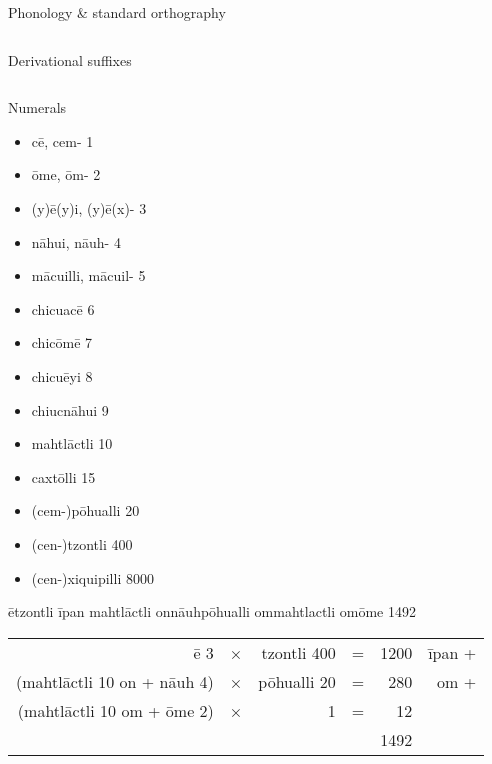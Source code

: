\documentclass[12pt]{beamer}
\newcommand{\nah}[1]{\textcolor{nahgrn}{#1}}
\newcommand{\trs}[1]{\textcolor{nahblu}{#1}}
\begin{document}
\begin{frame}
\begin{columns}[t]
\begin{column}{.22\linewidth}
\begin{block}{Phonology \& standard orthography}
\begin{threeparttable}
\begin{tablenotes}
\begin{frame}
\begin{columns}[t]
\begin{column}{.22\linewidth}
\begin{block}{Derivational suffixes}
\begin{threeparttable}
\begin{multicols}{2}
\begin{itemize}
\begin{column}{.26\linewidth}
      \begin{block}{Numerals}
        \begin{multicols}{2}
          \begin{itemize}
            \item \nah{cē}, \nah{cem-} \trs{1}
            \item \nah{ōme}, \nah{ōm-} \trs{2}
            \item \nah{(y)ē(y)i}, \nah{(y)ē(x)-} \trs{3}
            \item \nah{nāhui}, \nah{nāuh-} \trs{4}
            \item \nah{mācuilli}, \nah{mācuil-} \trs{5}
            \item \nah{chicuacē} \trs{6}
            \item \nah{chicōmē} \trs{7}
            \item \nah{chicuēyi} \trs{8}
            \item \nah{chiucnāhui} \trs{9}
            \item \nah{mahtlāctli} \trs{10}
            \item \nah{caxtōlli} \trs{15}
            \item \nah{(cem-)pōhualli} \trs{20}
            \item \nah{(cen-)tzontli} \trs{400}
            \item \nah{(cen-)xiquipilli} \trs{8000}
          \end{itemize}
        \end{multicols}
      \end{block}
      \begin{example}
        \nah{ētzontli īpan mahtlāctli onnāuhpōhualli ommahtlactli omōme} \trs{1492}
        \begin{center}
          \begin{tabular}{r@{~}c@{~}r@{~}c@{~}r@{~}r}
            \nah{ē} 3                                     & × & \nah{tzontli} 400 & = & 1200 & \nah{īpan} + \\
            (\nah{mahtlāctli} 10 \nah{on} + \nah{nāuh} 4) & × & \nah{pōhualli} 20 & = & 280  & \nah{om} +   \\
            (\nah{mahtlāctli} 10 \nah{om} + \nah{ōme} 2)  & × & 1                 & = & 12   &              \\\hline
                                                          &   &                   &   & 1492 &              \\
          \end{tabular}
        \end{center}
      \end{example}
    \end{column}


\end{itemize}
\end{multicols}
\end{threeparttable}
\end{block}
\end{column}
\end{columns}
\end{frame}
\end{tablenotes}
\end{threeparttable}
\end{block}
\end{column}
\end{columns}
\end{frame}
\end{document}
